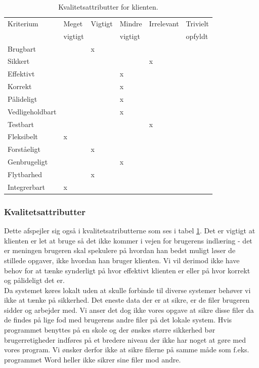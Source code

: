 \documentclass[10pt,a4paper,danish]{article}
\begin{document}
\begin{table}[h!]
  \begin{center}
    \begin{tabular}{llllll}
      \toprule
      Kriterium & Meget   & Vigtigt & Mindre  & Irrelevant & Trivielt \\
                & vigtigt &         & vigtigt &            & opfyldt  \\
      \midrule
      Brugbart        & &x& & & \\
      Sikkert         & & & &x& \\
      Effektivt       & & &x& & \\
      Korrekt         & & &x& & \\
      Pålideligt      & & &x& & \\
      Vedligeholdbart & & &x& & \\
      Testbart        & & & &x& \\
      Fleksibelt      &x& & & & \\
      Forståeligt     & &x& & & \\
      Genbrugeligt    & & &x& & \\
      Flytbarhed      & &x& & & \\
      Integrerbart    &x& & & & \\
      \bottomrule
    \end{tabular}
    \caption{Kvalitetsattributter for klienten.}
    \label{tab:kvalitetsattributter_program}
  \end{center}
\end{table}

\subsubsection{Kvalitetsattributter}
Dette afspejler sig også i kvalitetsatributterne som ses i tabel \ref{tab:kvalitetsattributter_program}.
Det er vigtigt at klienten er let at bruge så det ikke kommer i vejen for brugerens indlæring - det er meningen brugeren skal spekulere på hvordan han bedst muligt løser de stillede opgaver, ikke hvordan han bruger klienten.
Vi vil derimod ikke have behov for at tænke synderligt på hvor effektivt klienten er eller på hvor korrekt og pålideligt det er.
\\

Da systemet køres lokalt uden at skulle forbinde til diverse systemer behøver vi ikke at tænke på sikkerhed. Det eneste data der er at sikre, er de filer brugeren sidder og arbejder med. Vi anser det dog ikke vores opgave at sikre disse filer da de findes på lige fod med brugerens andre filer på det lokale system. Hvis programmet benyttes på en skole og der ønskes større sikkerhed bør brugerretigheder indføres på et bredere niveau der ikke har noget at gøre med vores program. Vi ønsker derfor ikke at sikre filerne på samme måde som f.eks. programmet Word heller ikke sikrer sine filer mod andre.
\\
\end{document}
